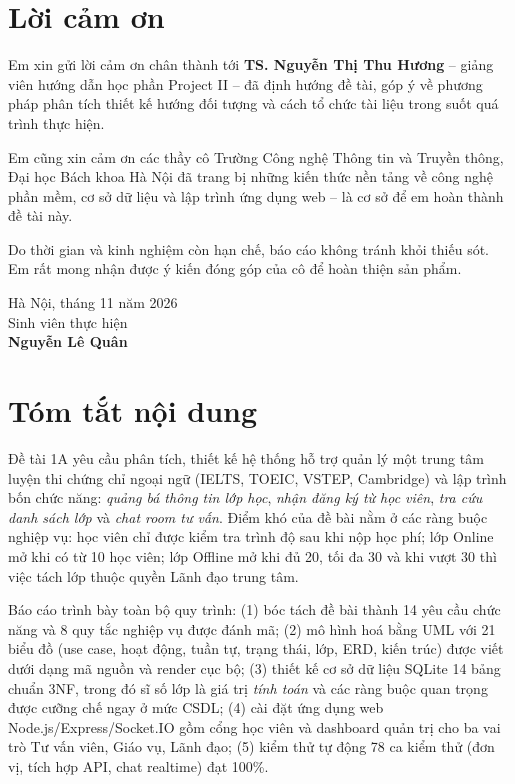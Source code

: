 \chapter*{Lời cảm ơn}

Em xin gửi lời cảm ơn chân thành tới \textbf{TS. Nguyễn Thị Thu Hương} – giảng viên hướng dẫn học phần Project II – đã định hướng đề tài, góp ý về phương pháp phân tích thiết kế hướng đối tượng và cách tổ chức tài liệu trong suốt quá trình thực hiện.

Em cũng xin cảm ơn các thầy cô Trường Công nghệ Thông tin và Truyền thông, Đại học Bách khoa Hà Nội đã trang bị những kiến thức nền tảng về công nghệ phần mềm, cơ sở dữ liệu và lập trình ứng dụng web – là cơ sở để em hoàn thành đề tài này.

Do thời gian và kinh nghiệm còn hạn chế, báo cáo không tránh khỏi thiếu sót. Em rất mong nhận được ý kiến đóng góp của cô để hoàn thiện sản phẩm.

\vspace{0.6cm}
\begin{flushright}
  Hà Nội, tháng 11 năm 2026\\
  Sinh viên thực hiện\\[1.4cm]
  \textbf{Nguyễn Lê Quân}
\end{flushright}

\chapter*{Tóm tắt nội dung}

Đề tài 1A yêu cầu phân tích, thiết kế hệ thống hỗ trợ quản lý một trung tâm luyện thi chứng chỉ ngoại ngữ (IELTS, TOEIC, VSTEP, Cambridge) và lập trình bốn chức năng: \textit{quảng bá thông tin lớp học}, \textit{nhận đăng ký từ học viên}, \textit{tra cứu danh sách lớp} và \textit{chat room tư vấn}. Điểm khó của đề bài nằm ở các ràng buộc nghiệp vụ: học viên chỉ được kiểm tra trình độ sau khi nộp học phí; lớp Online mở khi có từ 10 học viên; lớp Offline mở khi đủ 20, tối đa 30 và khi vượt 30 thì việc tách lớp thuộc quyền Lãnh đạo trung tâm.

Báo cáo trình bày toàn bộ quy trình: (1) bóc tách đề bài thành 14 yêu cầu chức năng và 8 quy tắc nghiệp vụ được đánh mã; (2) mô hình hoá bằng UML với 21 biểu đồ (use case, hoạt động, tuần tự, trạng thái, lớp, ERD, kiến trúc) được viết dưới dạng mã nguồn và render cục bộ; (3) thiết kế cơ sở dữ liệu SQLite 14 bảng chuẩn 3NF, trong đó sĩ số lớp là giá trị \emph{tính toán} và các ràng buộc quan trọng được cưỡng chế ngay ở mức CSDL; (4) cài đặt ứng dụng web Node.js/Express/Socket.IO gồm cổng học viên và dashboard quản trị cho ba vai trò Tư vấn viên, Giáo vụ, Lãnh đạo; (5) kiểm thử tự động 78 ca kiểm thử (đơn vị, tích hợp API, chat realtime) đạt 100\%.

